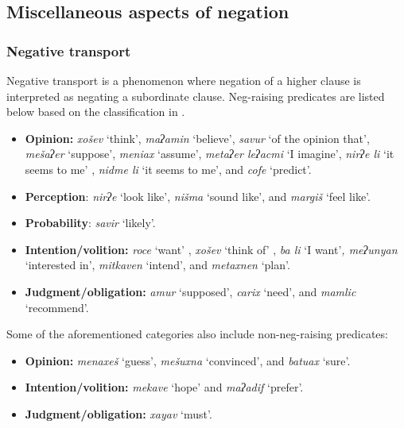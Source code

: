 \documentclass[output=paper,colorlinks,citecolor=brown]{langscibook}
\begin{document}
\subsection{Miscellaneous aspects of negation} \label{sec:heb:4.6}

\subsubsection{Negative transport} \label{sec:heb:4.6.1}


Negative transport is a phenomenon where negation of a higher clause is interpreted as negating a subordinate clause. Neg-raising predicates are listed below based on the classification in \citet{Horn1978}.

\begin{itemize}
    \item \textbf{Opinion:} \textit{xošev} ‘think', \textit{maʔamin} ‘believe', \textit{savur} ‘of the opinion that', \textit{mešaʔer} ‘suppose', \textit{meniax} ‘assume', \textit{metaʔer leʔacmi} ‘I imagine', \textit{nirʔe li} ‘it seems to me' \citep[275]{Tzivoni1993}, \textit{nidme li} ‘it seems to me', and \textit{cofe} ‘predict'. 
    \item \textbf{Perception}: \textit{nirʔe} ‘look like', \textit{nišma} ‘sound like', and \textit{margiš} ‘feel like'.
    \item \textbf{Probability}: \textit{savir} ‘likely'.
    \item \textbf{Intention/volition:} \textit{roce} ‘want' \citep[280]{Tzivoni1993}, \textit{xošev} ‘think of' \citep[273]{Tzivoni1993}, \textit{ba li} ‘I want'\textit{, meʔunyan} ‘interested in', \textit{mitkaven} ‘intend', and \textit{metaxnen} ‘plan'. 
    \item \textbf{Judgment/obligation:} \textit{amur} ‘supposed', \textit{carix} ‘need', and \textit{mamlic} ‘recommend'. 
\end{itemize}

Some of the aforementioned categories also include non-neg-raising predicates:

\begin{itemize}
    \item \textbf{Opinion:} \textit{menaxeš} ‘guess', \textit{mešuxna} ‘convinced', and \textit{batuax} ‘sure'.
    \item \textbf{Intention/volition:} \textit{mekave} ‘hope' and \textit{maʔadif} ‘prefer'.
    \item \textbf{Judgment/obligation:} \textit{xayav} ‘must'.
\end{itemize}
\end{document}
